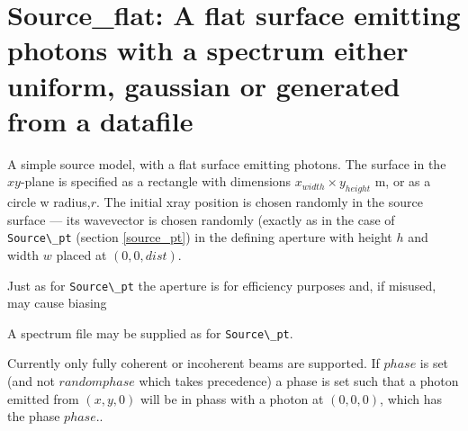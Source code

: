 \section{Source\_flat: A flat surface emitting photons with a spectrum either uniform, gaussian or generated from a datafile}
\label{source-flat}

A simple source model, with a flat surface emitting photons. The surface in the
$xy$-plane is specified as a rectangle with dimensions
$x_{width}\times y_{height}$ m, or as a circle w radius,$r$. 
The initial xray position is chosen randomly in the source surface --- its
wavevector is chosen randomly (exactly as in the case of \verb+Source\_pt+ (section \ref{source_pt}) in the defining aperture with height $h$ and
width $w$ placed at $(0,0,dist)$. 

Just as for \verb+Source\_pt+ the aperture is for efficiency purposes and, if misused, may cause biasing

A spectrum file may be supplied as for \verb+Source\_pt+.

Currently only fully coherent or incoherent beams are supported. If $phase$ is set (and not $randomphase$ which takes precedence) a phase is set such that a photon emitted from $(x,y,0)$ will be in phass with a photon at $(0,0,0)$, which has the phase $phase$..
